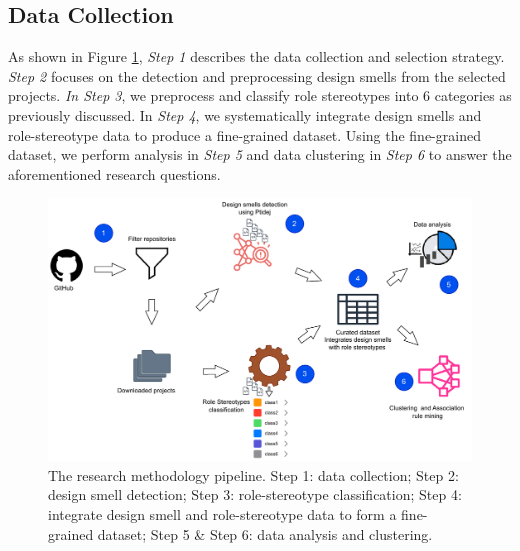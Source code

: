 \documentclass[AMA,Times1COL]{WileyNJDv5} %
\begin{document}
\subsection{Data Collection}
As shown in Figure \ref{fig:conceptualfw}, \textit{Step 1} describes the data collection and selection strategy. \textit{Step 2} focuses on the detection and preprocessing design smells from the selected projects. \textit{In Step 3}, we preprocess and classify role stereotypes into 6 categories as previously discussed. In \textit{Step 4}, we systematically integrate design smells and role-stereotype data to produce a fine-grained dataset. Using the fine-grained dataset, we perform analysis in \textit{Step 5} and data clustering in \textit{Step 6}  to answer the aforementioned research questions.
\begin{figure}[h]
	\centering
	\includegraphics[scale=0.7]{figures/research_design.pdf}
	\caption[Methodology Pipeline]{The research methodology pipeline. Step 1: data collection; Step 2: design smell detection; Step 3: role-stereotype classification; Step 4: integrate design smell and role-stereotype data to form a fine-grained dataset; Step 5 \& Step 6: data analysis and clustering.}
	\label{fig:conceptualfw}
\end{figure}
\end{document}
